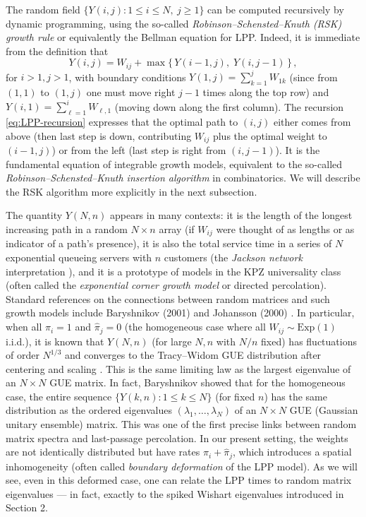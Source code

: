 \documentclass[letterpaper,11pt,oneside,reqno]{article}
\numberwithin{equation}{section}
\theoremstyle{definition}
\begin{document}
The random field $\{Y(i,j): 1\le i\le N,\ j\ge 1\}$ can be computed recursively by dynamic programming, using the so-called \emph{Robinson--Schensted--Knuth (RSK) growth rule} or equivalently the Bellman equation for LPP. Indeed, it is immediate from the definition that
\begin{equation}\label{eq:LPP-recursion}
Y(i,j) = W_{ij} + \max\{\, Y(i-1,j),\; Y(i,j-1)\,\}\,,
\end{equation}
for $i>1, j>1$, with boundary conditions $Y(1,j) = \sum_{k=1}^j W_{1k}$ (since from $(1,1)$ to $(1,j)$ one must move right $j-1$ times along the top row) and $Y(i,1) = \sum_{\ell=1}^i W_{\ell,1}$ (moving down along the first column). The recursion \eqref{eq:LPP-recursion} expresses that the optimal path to $(i,j)$ either comes from above (then last step is down, contributing $W_{ij}$ plus the optimal weight to $(i-1,j)$) or from the left (last step is right from $(i,j-1)$). It is the fundamental equation of integrable growth models, equivalent to the so-called \emph{Robinson--Schensted--Knuth insertion algorithm} in combinatorics. We will describe the RSK algorithm more explicitly in the next subsection.

The quantity $Y(N,n)$ appears in many contexts: it is the length of the longest increasing path in a random $N\times n$ array (if $W_{ij}$ were thought of as lengths or as indicator of a path's presence), it is also the total service time in a series of $N$ exponential queueing servers with $n$ customers (the \emph{Jackson network} interpretation \cite{GUEqueues2001}), and it is a prototype of models in the KPZ universality class (often called the \emph{exponential corner growth model} or directed percolation). Standard references on the connections between random matrices and such growth models include Baryshnikov (2001) \cite{GUEqueues2001} and Johansson (2000) \cite{Johansson2000}. In particular, when all $\pi_i=1$ and $\hat\pi_j=0$ (the homogeneous case where all $W_{ij}\sim \mathrm{Exp}(1)$ i.i.d.), it is known that $Y(N,n)$ (for large $N,n$ with $N/n$ fixed) has fluctuations of order $N^{1/3}$ and converges to the Tracy--Widom GUE distribution after centering and scaling \cite{Johansson2000}. This is the same limiting law as the largest eigenvalue of an $N\times N$ GUE matrix. In fact, Baryshnikov \cite{GUEqueues2001} showed that for the homogeneous case, the entire sequence $\{Y(k,n):1\le k\le N\}$ (for fixed $n$) has the same distribution as the ordered eigenvalues $(\lambda_1,\dots,\lambda_N)$ of an $N\times N$ GUE (Gaussian unitary ensemble) matrix. This was one of the first precise links between random matrix spectra and last-passage percolation. In our present setting, the weights are not identically distributed but have rates $\pi_i+\hat\pi_j$, which introduces a spatial inhomogeneity (often called \emph{boundary deformation} of the LPP model). As we will see, even in this deformed case, one can relate the LPP times to random matrix eigenvalues --- in fact, exactly to the spiked Wishart eigenvalues introduced in Section 2.
\end{document}
